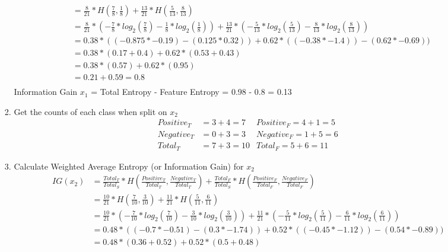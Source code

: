\documentclass[12pt]{article}
\begin{document}
\begin{enumerate}
\begin{enumerate}
\begin{enumerate}
\begin{equation*}
\begin{split}
	            &= \frac{8}{21} * H(\frac{7}{8},\frac{1}{8}) + \frac{13}{21} * H(\frac{5}{13},\frac{8}{13}) \\
	            &= \frac{8}{21} * (-\frac{7}{8} * log_{2}(\frac{7}{8}) - \frac{1}{8} * log_{2}(\frac{1}{8})) + \frac{13}{21} * (-\frac{5}{13} * log_{2}(\frac{5}{13}) - \frac{8}{13} * log_{2}(\frac{8}{13})) \\
	            &= 0.38 * ((-0.875 * -0.19) - (0.125 * 0.32)) + 0.62 * ((-0.38 * -1.4)) - (0.62 * -0.69)) \\
	            &= 0.38 * (0.17 + 0.4) + 0.62 * (0.53 + 0.43) \\
	            &= 0.38 * (0.57) + 0.62 * (0.95) \\
	            &= 0.21 + 0.59 = 0.8 \\
	        \end{split}
	    \end{equation*}
	        Information Gain $x_1$ = Total Entropy - Feature Entropy = 0.98 - 0.8 = 0.13
	    \item Get the counts of each class when split on $x_2$
	    \begin{align*}
	        Positive_T &= 3 + 4 = 7 & Positive_F = 4 + 1 = 5 \\
	        Negative_T &= 0 + 3 = 3 & Negative_F = 1 + 5 = 6 \\ 
	        Total_T &= 7 + 3 = 10 & Total_F = 5 + 6 = 11
	    \end{align*}
	    \item Calculate Weighted Average Entropy (or Information Gain) for $x_2$
	    \begin{equation*}
	        \begin{split}
	            IG(x_2) &= \frac{Total_T}{Total_S} * H(\frac{Positive_T}{Total_T},\frac{Negative_T}{Total_T}) + \frac{Total_F}{Total_S} * H(\frac{Positive_F}{Total_F},\frac{Negative_F}{Total_F}) \\
	            &= \frac{10}{21} * H(\frac{7}{10},\frac{3}{10}) + \frac{11}{21} * H(\frac{5}{11},\frac{6}{11}) \\
	            &= \frac{10}{21} * (-\frac{7}{10} * log_{2}(\frac{7}{10}) - \frac{3}{10} * log_{2}(\frac{3}{10})) + \frac{11}{21} * (-\frac{5}{11} * log_{2}(\frac{5}{11}) - \frac{6}{11} * log_{2}(\frac{6}{11})) \\
	            &= 0.48 * ((-0.7 * -0.51) - (0.3 * -1.74)) + 0.52 * ((-0.45 * -1.12)) - (0.54 * -0.89)) \\
	            &= 0.48 * (0.36 + 0.52) + 0.52 * (0.5 + 0.48) \\

\end{split}
\end{equation*}
\end{enumerate}
\end{enumerate}
\end{enumerate}
\end{document}
